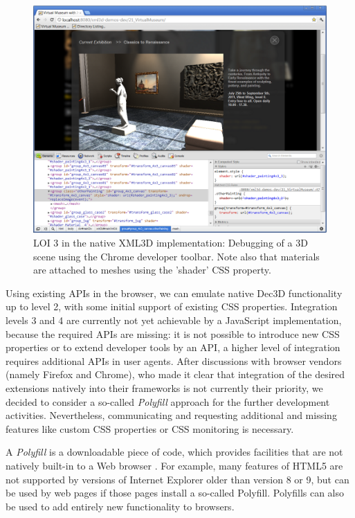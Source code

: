 \documentclass{acmsiggraph}
\begin{document}
\begin{figure}
  \centering
  \includegraphics[width=0.9\columnwidth]{images/museum.png}
  \caption{LOI 3 in the native XML3D implementation: Debugging of a 3D scene using the Chrome developer toolbar. Note also that materials are attached to meshes using the 'shader' CSS property.}
  \label{fig:debugger}
\end{figure}

Using existing APIs in the browser, we can emulate native Dec3D functionality up to level 2, with some initial support of existing CSS properties.
Integration levels 3 and 4 are currently not yet achievable by a JavaScript implementation, because the required APIs are missing: it is not possible to introduce new CSS properties or to extend developer tools by an API, a higher level of integration requires additional APIs in user agents. After discussions with browser vendors (namely Firefox and Chrome), who made it clear that integration of the desired extensions natively into their frameworks is not currently their priority, we decided to consider a so-called \textit{Polyfill} approach for the further development activities.
Nevertheless, communicating and requesting additional and missing features like custom CSS properties or CSS monitoring is necessary.

A \textit{Polyfill} is a downloadable piece of code, which provides facilities that are not natively built-in to a Web browser \cite{Sharp2010}. For example, many features of HTML5 are not supported by versions of Internet Explorer older than version 8 or 9, but can be used by web pages if those pages install a so-called Polyfill. Polyfills can also be used to add entirely new functionality to browsers.
\end{document}
